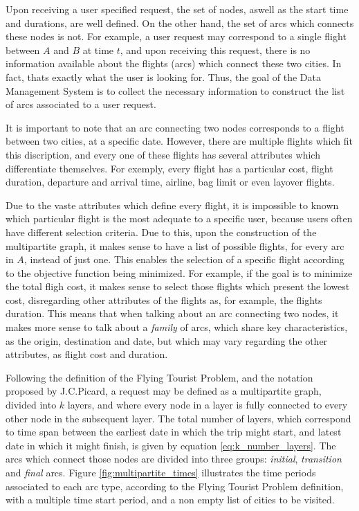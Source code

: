 
Upon receiving a user specified request, the set of nodes, aswell as the start time and durations,
are well defined. On the other hand, the set of arcs which connects these nodes is not.
For example, a user request may correspond to a single flight between $A$ and $B$ at time $t$,
and upon receiving this request, there is no information available about the flights (arcs)
which connect these two cities. In fact, thats exactly what the user is looking for.
Thus, the goal of the Data Management System is to collect the necessary information 
to construct the list of arcs associated to a user request.

It is important to note that an arc connecting two nodes corresponds 
to a flight between two cities, at a specific date. However, there are multiple 
flights which fit this discription, and every one of these flights has several attributes 
which differentiate themselves. For exemply, every flight has a particular cost,
flight duration, departure and arrival time, airline, bag limit or even 
layover flights.

Due to the vaste attributes which define every flight,
it is impossible to known which particular flight is the most adequate to a specific user,
because users often have different selection criteria.
Due to this, upon the construction of the multipartite graph,
it makes sense to have a list of possible flights, for every arc in $A$,
instead of just one.
This enables the selection of a specific flight according to the objective function being minimized.
For example, if the goal is to minimize the total fligh cost,
it makes sense to select those flights which present the lowest cost, 
disregarding other attributes of the flights as, for example, the flights duration.
This means that when talking about an arc connecting two nodes, it makes more sense to talk about 
a \textit{family} of arcs, which share key characteristics, as the origin, destination and date,
but which may vary regarding the other attributes, as flight cost and duration.


Following the definition of the Flying Tourist Problem, and the notation proposed by J.C.Picard,
a request may be defined as a multipartite graph, divided into $k$ layers,
and where every node in a layer is fully connected to every other node in the subsequent layer.
The total number of layers, which correspond to time span between the earliest date in which the trip might start,
and latest date in which it might finish, is given by equation \ref{eq:k_number_layers}.
The arcs which connect those nodes are divided into three groups: \textit{initial}, \textit{transition} and \textit{final} arcs.
Figure \ref{fig:multipartite_times} illustrates the time periods associated to each arc type,
according to the Flying Tourist Problem definition, with a multiple time start period,
and a non empty list of cities to be visited.


